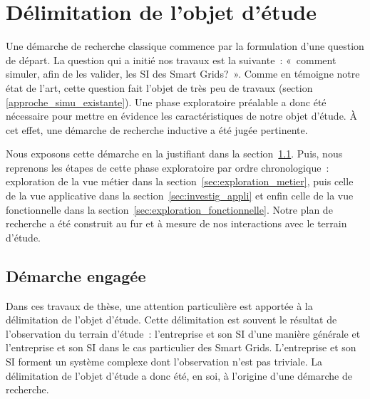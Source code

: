 \chapter{Délimitation de l'objet d'étude}
\label{ch:methodo}

\PartialToc


Une démarche de recherche classique commence par la formulation d'une question 
de départ. La question qui a initié nos travaux est la suivante~: «~comment 
simuler, afin de les valider, les SI des Smart Grids?~».  Comme en témoigne notre 
état de l'art, cette question fait l'objet de très peu de travaux (section 
\ref{approche_simu_existante}). Une phase exploratoire préalable a donc été nécessaire 
pour mettre en évidence les caractéristiques de notre objet d'étude. À cet effet,
une démarche de recherche inductive a été jugée pertinente.

Nous exposons cette démarche en la justifiant dans la section~\ref{sec:demarche_objet_etude}.
Puis, nous reprenons les étapes de cette phase exploratoire 
par ordre chronologique~: exploration de la vue métier dans la section~\ref{sec:exploration_metier}, puis celle de la vue 
applicative dans la section~\ref{sec:investig_appli} et enfin celle de la vue fonctionnelle dans 
la section~\ref{sec:exploration_fonctionnelle}.
Notre plan de recherche a été 
construit au fur et à mesure de nos interactions avec le terrain d'étude. 








\section{Démarche engagée}
\label{sec:demarche_objet_etude}
		
Dans ces travaux de thèse, une attention particulière est apportée à la délimitation de l'objet d'étude. 
Cette délimitation est souvent le résultat de l'observation du terrain d'étude~: 
l'entreprise et son SI d'une manière générale et l'entreprise et son SI dans le 
cas particulier des Smart Grids. L'entreprise et son SI forment un système 
complexe dont l'observation n'est pas triviale. La délimitation de l'objet 
d'étude a donc été, en soi, à l'origine d'une démarche de recherche.

